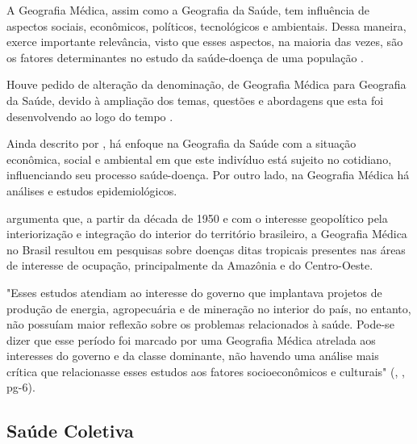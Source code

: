 \indent A Geografia Médica, assim como a Geografia da Saúde, tem influência de aspectos sociais, econômicos, políticos, tecnológicos e ambientais. Dessa maneira, exerce importante relevância, visto que esses aspectos, na maioria das vezes, são os fatores determinantes no estudo da saúde-doença de uma população \cite{GeografiaMedica2020}.

\indent Houve pedido de alteração da denominação, de Geografia Médica para Geografia da Saúde, devido à ampliação dos temas, questões e abordagens que esta foi desenvolvendo ao logo do tempo \cite{GeografiaMedica2009}.

\indent Ainda descrito por , há enfoque na Geografia da Saúde com a situação econômica, social e ambiental em que este indivíduo está sujeito no cotidiano, influenciando seu processo saúde-doença. Por outro lado, na Geografia Médica há análises e estudos epidemiológicos.

\indent {} argumenta que, a partir da década de 1950 e com o interesse geopolítico pela interiorização e integração do interior do território brasileiro, a Geografia Médica no Brasil resultou em pesquisas sobre doenças ditas tropicais presentes nas áreas de interesse de ocupação, principalmente da Amazônia e do Centro-Oeste.

\begin{citacao}
"Esses estudos atendiam ao interesse do governo que implantava projetos de produção de energia, agropecuária e de mineração no interior do país, no entanto, não possuíam maior reflexão sobre os problemas relacionados à saúde. Pode-se dizer que esse período foi marcado por uma Geografia Médica atrelada aos interesses do governo e da classe dominante, não havendo uma análise mais crítica que relacionasse esses estudos aos fatores
socioeconômicos e culturais" (\citeauthor{GeografiaMedica2009}, \citeyear{GeografiaMedica2009}, pg-6).
\end{citacao}



\subsection{Saúde Coletiva}

